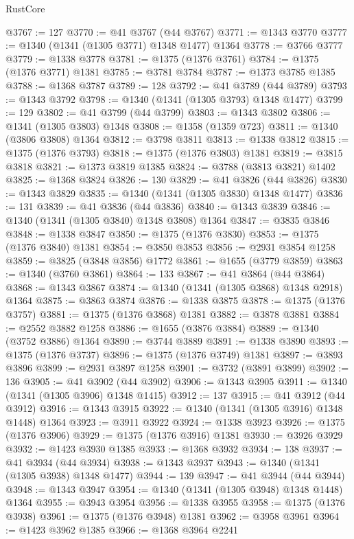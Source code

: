\begin{lexlean}{RustCore}
\begin{coremodule}
@3767 := 127
@3770 := @41 @3767 (@44 @3767)
@3771 := @1343 @3770
@3777 := @1340 (@1341 (@1305 @3771) @1348 @1477) @1364
@3778 := @3766 @3777
@3779 := @1338 @3778
@3781 := @1375 (@1376 @3761)
@3784 := @1375 (@1376 @3771) @1381
@3785 := @3781 @3784
@3787 := @1373 @3785 @1385
@3788 := @1368 @3787
@3789 := 128
@3792 := @41 @3789 (@44 @3789)
@3793 := @1343 @3792
@3798 := @1340 (@1341 (@1305 @3793) @1348 @1477)
@3799 := 129
@3802 := @41 @3799 (@44 @3799)
@3803 := @1343 @3802
@3806 := @1341 (@1305 @3803) @1348
@3808 := @1358 (@1359 @723)
@3811 := @1340 (@3806 @3808) @1364
@3812 := @3798 @3811
@3813 := @1338 @3812
@3815 := @1375 (@1376 @3793)
@3818 := @1375 (@1376 @3803) @1381
@3819 := @3815 @3818
@3821 := @1373 @3819 @1385
@3824 := @3788 (@3813 @3821) @1402
@3825 := @1368 @3824
@3826 := 130
@3829 := @41 @3826 (@44 @3826)
@3830 := @1343 @3829
@3835 := @1340 (@1341 (@1305 @3830) @1348 @1477)
@3836 := 131
@3839 := @41 @3836 (@44 @3836)
@3840 := @1343 @3839
@3846 := @1340 (@1341 (@1305 @3840) @1348 @3808) @1364
@3847 := @3835 @3846
@3848 := @1338 @3847
@3850 := @1375 (@1376 @3830)
@3853 := @1375 (@1376 @3840) @1381
@3854 := @3850 @3853
@3856 := @2931 @3854 @1258
@3859 := @3825 (@3848 @3856) @1772
@3861 := @1655 (@3779 @3859)
@3863 := @1340 (@3760 @3861)
@3864 := 133
@3867 := @41 @3864 (@44 @3864)
@3868 := @1343 @3867
@3874 := @1340 (@1341 (@1305 @3868) @1348 @2918) @1364
@3875 := @3863 @3874
@3876 := @1338 @3875
@3878 := @1375 (@1376 @3757)
@3881 := @1375 (@1376 @3868) @1381
@3882 := @3878 @3881
@3884 := @2552 @3882 @1258
@3886 := @1655 (@3876 @3884)
@3889 := @1340 (@3752 @3886) @1364
@3890 := @3744 @3889
@3891 := @1338 @3890
@3893 := @1375 (@1376 @3737)
@3896 := @1375 (@1376 @3749) @1381
@3897 := @3893 @3896
@3899 := @2931 @3897 @1258
@3901 := @3732 (@3891 @3899)
@3902 := 136
@3905 := @41 @3902 (@44 @3902)
@3906 := @1343 @3905
@3911 := @1340 (@1341 (@1305 @3906) @1348 @1415)
@3912 := 137
@3915 := @41 @3912 (@44 @3912)
@3916 := @1343 @3915
@3922 := @1340 (@1341 (@1305 @3916) @1348 @1448) @1364
@3923 := @3911 @3922
@3924 := @1338 @3923
@3926 := @1375 (@1376 @3906)
@3929 := @1375 (@1376 @3916) @1381
@3930 := @3926 @3929
@3932 := @1423 @3930 @1385
@3933 := @1368 @3932
@3934 := 138
@3937 := @41 @3934 (@44 @3934)
@3938 := @1343 @3937
@3943 := @1340 (@1341 (@1305 @3938) @1348 @1477)
@3944 := 139
@3947 := @41 @3944 (@44 @3944)
@3948 := @1343 @3947
@3954 := @1340 (@1341 (@1305 @3948) @1348 @1448) @1364
@3955 := @3943 @3954
@3956 := @1338 @3955
@3958 := @1375 (@1376 @3938)
@3961 := @1375 (@1376 @3948) @1381
@3962 := @3958 @3961
@3964 := @1423 @3962 @1385
@3966 := @1368 @3964 @2241

\end{coremodule}
\end{lexlean}
